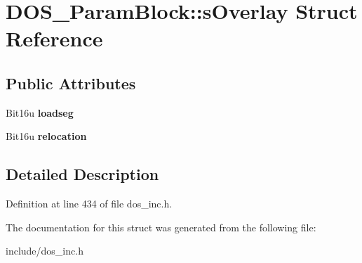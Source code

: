 \hypertarget{structDOS__ParamBlock_1_1sOverlay}{\section{D\-O\-S\-\_\-\-Param\-Block\-:\-:s\-Overlay Struct Reference}
\label{structDOS__ParamBlock_1_1sOverlay}
}
\subsection*{Public Attributes}
\begin{DoxyCompactItemize}
\item 
\hypertarget{structDOS__ParamBlock_1_1sOverlay_a6aa3b07fbae37d952b116773e87712cc}{Bit16u {\bfseries loadseg}}\label{structDOS__ParamBlock_1_1sOverlay_a6aa3b07fbae37d952b116773e87712cc}

\item 
\hypertarget{structDOS__ParamBlock_1_1sOverlay_a1fec335c736328ce8eb8096a2df9ccc6}{Bit16u {\bfseries relocation}}\label{structDOS__ParamBlock_1_1sOverlay_a1fec335c736328ce8eb8096a2df9ccc6}

\end{DoxyCompactItemize}


\subsection{Detailed Description}


Definition at line 434 of file dos\-\_\-inc.\-h.



The documentation for this struct was generated from the following file\-:\begin{DoxyCompactItemize}
\item 
include/dos\-\_\-inc.\-h\end{DoxyCompactItemize}
